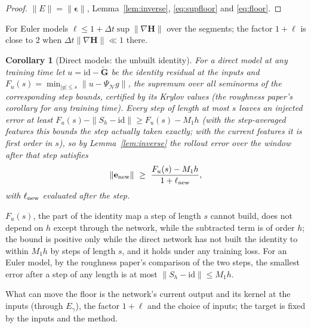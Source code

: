 \documentclass[11pt]{article}
\newtheorem{corollary}{Corollary}
\theoremstyle{definition}
\theoremstyle{remark}
\newcommand{\ee}{\mathbf{e}}
\newcommand{\Gt}{\tilde{\mathbf{G}}}
\newcommand{\Hop}{\mathbf{H}}
\newcommand{\eps}{\bm{\epsilon}}
\newcommand{\dt}{\Delta t}
\begin{document}
\begin{proof}
$\|E\|=\|\eps\|$, Lemma~\ref{lem:inverse}, \eqref{eq:supfloor} and \eqref{eq:floor}.
\end{proof}

For Euler models $\ell\le1+\dt\sup\|\nabla\Hop\|$ over the segments; the factor $1+\ell$ is close to $2$ when $\dt\|\nabla\Hop\|\ll1$ there.

\begin{corollary}[Direct models: the unbuilt identity]\label{cor:directrollout}
For a direct model at any training time let $u=\mathrm{id}-\Gt$ be the identity residual at the inputs and $F_u(s)=\min_{|g|\le s}\|u-\Psi_{\mathcal N}g\|$, the supremum over all seminorms of the corresponding step bounds, certified by its Krylov values (the roughness paper's corollary for any training time).
Every step of length at most $s$ leaves an injected error at least $F_u(s)-\|S_h-\mathrm{id}\|\ge F_u(s)-M_1h$ (with the step-averaged features this bounds the step actually taken exactly; with the current features it is first order in $s$), so by Lemma~\ref{lem:inverse} the rollout error over the window after that step satisfies
\[
\|\ee_{\rm new}\|\ \ge\ \frac{F_u(s)-M_1h}{1+\ell_{\rm new}} ,
\]
with $\ell_{\rm new}$ evaluated after the step.
\end{corollary}

$F_u(s)$, the part of the identity map a step of length $s$ cannot build, does not depend on $h$ except through the network, while the subtracted term is of order $h$; the bound is positive only while the direct network has not built the identity to within $M_1h$ by steps of length $s$, and it holds under any training loss.
For an Euler model, by the roughness paper's comparison of the two steps, the smallest error after a step of any length is at most $\|S_h-\mathrm{id}\|\le M_1h$.

What can move the floor is the network's current output and its kernel at the inputs (through $E_\gamma$), the factor $1+\ell$ and the choice of inputs; the target is fixed by the inputs and the method.
\end{document}

